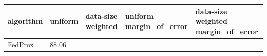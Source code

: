 \begin{tabular}{lllll}
\toprule
algorithm & uniform & data-size weighted & uniform margin_of_error & data-size weighted margin_of_error \\
\midrule
FedProx & 88.06%
\bottomrule
\end{tabular}

